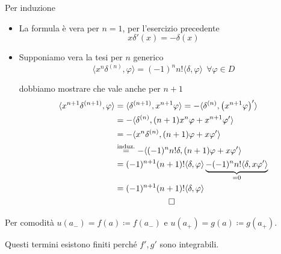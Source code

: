 Per induzione
\begin{itemize}
\item La formula è vera per $n=1$, per l'esercizio precedente\begin{equation*}
x\delta '( x) =-\delta ( x)
\end{equation*}
\item Supponiamo vera la tesi per $n$ generico\begin{equation*}
\langle x^{n} \delta ^{( n)} ,\varphi \rangle =( -1)^{n} n!\langle \delta ,\varphi \rangle \ \ \forall \varphi \in D
\end{equation*}

dobbiamo mostrare che vale anche per $n+1$\begin{gather*}
\begin{aligned}
\langle x^{n+1} \delta ^{( n+1)} ,\varphi \rangle  & =\langle \delta ^{( n+1)} ,x^{n+1} \varphi \rangle =-\langle \delta ^{( n)} ,\left( x^{n+1} \varphi \right) '\rangle \\
 & =-\langle \delta ^{( n)} ,( n+1) x^{n} \varphi +x^{n+1} \varphi '\rangle \\
 & =-\langle x^{n} \delta ^{( n)} ,( n+1) \varphi +x\varphi '\rangle \\
 & \overset{\text{induz.}}{=} -\langle ( -1)^{n} n!\delta ,( n+1) \varphi +x\varphi '\rangle \\
 & =( -1)^{n+1}( n+1) !\langle \delta ,\varphi \rangle \underbrace{-( -1)^{n} n!\langle \delta ,x\varphi '\rangle }_{=0}\\
 & =( -1)^{n+1}( n+1) !\langle \delta ,\varphi \rangle 
\end{aligned}\\
\qed 
\end{gather*}
\end{itemize}
\Soluzione

Per comodità $u( a_{-}) =f( a) \coloneqq f( a_{-})$ e $u( a_{+}) =g( a) \coloneqq g( a_{+})$.

Questi termini esistono finiti perché $f',g'$ sono integrabili.

